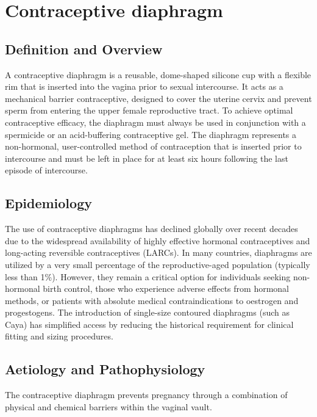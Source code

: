 \chapter{Contraceptive diaphragm}

\section*{Definition and Overview}
A contraceptive diaphragm is a reusable, dome-shaped silicone cup with a flexible rim that is inserted into the vagina prior to sexual intercourse. It acts as a mechanical barrier contraceptive, designed to cover the uterine cervix and prevent sperm from entering the upper female reproductive tract. To achieve optimal contraceptive efficacy, the diaphragm must always be used in conjunction with a spermicide or an acid-buffering contraceptive gel. The diaphragm represents a non-hormonal, user-controlled method of contraception that is inserted prior to intercourse and must be left in place for at least six hours following the last episode of intercourse.

\section*{Epidemiology}
The use of contraceptive diaphragms has declined globally over recent decades due to the widespread availability of highly effective hormonal contraceptives and long-acting reversible contraceptives (LARCs). In many countries, diaphragms are utilized by a very small percentage of the reproductive-aged population (typically less than 1\%). However, they remain a critical option for individuals seeking non-hormonal birth control, those who experience adverse effects from hormonal methods, or patients with absolute medical contraindications to oestrogen and progestogens. The introduction of single-size contoured diaphragms (such as Caya) has simplified access by reducing the historical requirement for clinical fitting and sizing procedures.

\section*{Aetiology and Pathophysiology}
The contraceptive diaphragm prevents pregnancy through a combination of physical and chemical barriers within the vaginal vault.

